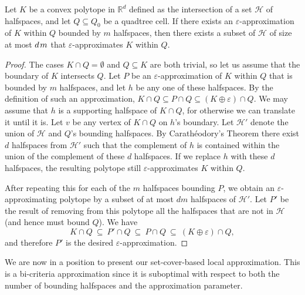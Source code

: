 \documentclass[11pt]{article}   \usepackage[letterpaper,hmargin=2.1cm,vmargin=3cm]{geometry}
\newcommand{\RE}{\mathbb{R}}    \newcommand{\ZZ}{\mathbb{Z}}    \newcommand{\eps}{\varepsilon}  \newcommand{\ST}{\,:\,}         \newcommand{\sq}{\square}
\renewcommand{\P}{\kern+1pt}    \newcommand{\N}{\kern-2pt}      \newcommand{\NN}{\kern-4pt}     \newcommand{\polar}[1]{\mathrm{polar}(#1)}            \newcommand{\polarX}[2]{\mathrm{polar}_{#1}(#2)}
\begin{document}
\begin{lemma} \label{lem:discrete-apx}
Let $K$ be a convex polytope in $\RE^d$ defined as the intersection of a set $\mathcal{H}$ of halfspaces, and let $Q \subseteq Q_0$ be a quadtree cell. If there exists an $\eps$-approximation of $K$ within $Q$ bounded by $m$ halfspaces, then there exists a subset of $\mathcal{H}$ of size at most $d \P m$ that $\eps$-approximates $K$ within $Q$. 
\end{lemma}


\begin{proof}
The cases $K \cap Q = \emptyset$ and $Q \subseteq K$ are both trivial, so let us assume that the boundary of $K$ intersects $Q$. Let $P$ be an $\eps$-approximation of $K$ within $Q$ that is bounded by $m$ halfspaces, and let $h$ be any one of these halfspaces. By the definition of  such an approximation, $K \cap Q \subseteq P \cap Q \subseteq (K \oplus \eps) \cap Q$. We may assume that $h$ is a supporting halfspace of $K \cap Q$, for otherwise we can translate it until it is. Let $v$ be any vertex of $K \cap Q$ on $h$'s boundary. Let $\mathcal{H}'$ denote the union of $\mathcal{H}$ and $Q$'s bounding halfspaces. By Carath\'{e}odory's Theorem there exist $d$ halfspaces from $\mathcal{H}'$ such that the complement of $h$ is contained within the union of the complement of these $d$ halfspaces. If we replace $h$ with these $d$ halfspaces, the resulting polytope still $\eps$-approximates $K$ within $Q$. 

After repeating this for each of the $m$ halfspaces bounding $P$, we obtain an $\eps$-approximating polytope by a subset of at most $d m$ halfspaces of $\mathcal{H}'$. Let $P'$ be the result of removing from this polytope all the halfspaces that are not in $\mathcal{H}$ (and hence must bound $Q$). We have
\[
  K \cap Q 
	~ \subseteq ~ P' \cap Q 
	~ \subseteq ~ P \cap Q
	~ \subseteq ~ (K \oplus \eps) \cap Q,
\]
and therefore $P'$ is the desired $\eps$-approximation.
\end{proof}


We are now in a position to present our set-cover-based local approximation. This is a bi-criteria approximation since it is suboptimal with respect to both the number of bounding halfspaces and the approximation parameter.
\end{document}
